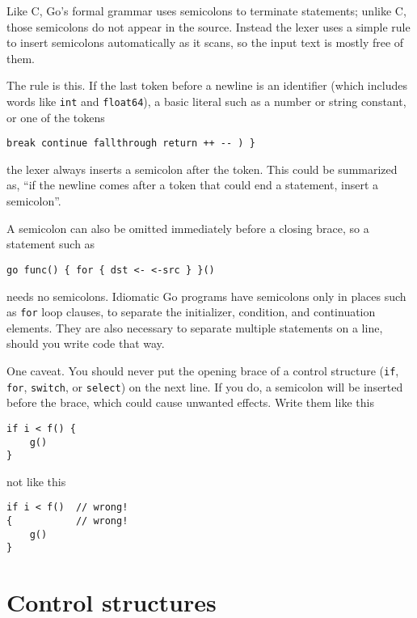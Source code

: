 Like C, Go's formal grammar uses semicolons to terminate statements;
unlike C, those semicolons do not appear in the source. Instead the
lexer uses a simple rule to insert semicolons automatically as it scans,
so the input text is mostly free of them.

The rule is this. If the last token before a newline is an identifier
(which includes words like \texttt{int} and \texttt{float64}), a basic
literal such as a number or string constant, or one of the tokens

\begin{Verbatim}[frame=single]
break continue fallthrough return ++ -- ) }
\end{Verbatim}

the lexer always inserts a semicolon after the token. This could be
summarized as, ``if the newline comes after a token that could end a
statement, insert a semicolon''.

A semicolon can also be omitted immediately before a closing brace, so a
statement such as

\begin{Verbatim}[frame=single]
    go func() { for { dst <- <-src } }()
\end{Verbatim}

needs no semicolons. Idiomatic Go programs have semicolons only in
places such as \texttt{for} loop clauses, to separate the initializer,
condition, and continuation elements. They are also necessary to
separate multiple statements on a line, should you write code that way.

One caveat. You should never put the opening brace of a control
structure (\texttt{if}, \texttt{for}, \texttt{switch}, or
\texttt{select}) on the next line. If you do, a semicolon will be
inserted before the brace, which could cause unwanted effects. Write
them like this

\begin{Verbatim}[frame=single]
if i < f() {
    g()
}
\end{Verbatim}

not like this

\begin{Verbatim}[frame=single]
if i < f()  // wrong!
{           // wrong!
    g()
}
\end{Verbatim}

\section*{Control structures}

